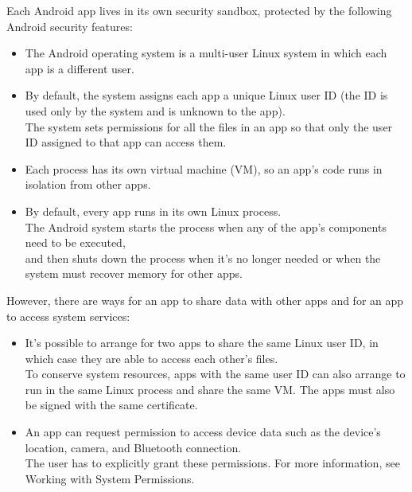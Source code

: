 \newpage

Each Android app lives in its own security sandbox, protected by the following Android security features: \\ 
\begin{itemize}
    \item The Android operating system is a multi-user Linux system in which each app is a different user. \\
    \item By default, the system assigns each app a unique Linux user ID (the ID is used only by the system and is unknown to the app). \\
    The system sets permissions for all the files in an app so that only the user ID assigned to that app can access them. \\   
    \item Each process has its own virtual machine (VM), so an app's code runs in isolation from other apps. \\
    \item By default, every app runs in its own Linux process.  \\ 
    The Android system starts the process when any of the app's components need to be executed, \\
    and then shuts down the process when it's no longer needed or when the system must recover memory for other apps. \\
\end{itemize}

However, there are ways for an app to share data with other apps and for an app to access system services:\\ 
\begin{itemize}
    \item It's possible to arrange for two apps to share the same Linux user ID, in which case they are able to access each other's files. \\
    To conserve system resources, apps with the same user ID can also arrange to run in the same Linux process and share the same VM. The apps must also be signed with the same certificate.\\
    \item An app can request permission to access device data such as the device's location, camera, and Bluetooth connection.\\ 
    The user has to explicitly grant these permissions. For more information, see Working with System Permissions.\\
\end{itemize}

